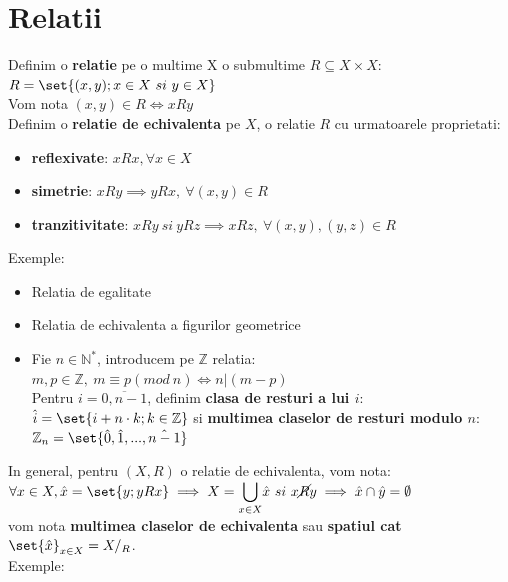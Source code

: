 \documentclass{article}
\begin{document}
    \section{Relatii}
        Definim o \textbf{relatie} pe o multime X o submultime $R \subseteq X \times X$:\\
        $R = \set{(x,y); x\in X\ si\ y \in X}$\\
        Vom nota $(x,y) \in R \iff xRy$\\
        Definim o \textbf{relatie de echivalenta} pe $X$, o relatie $R$ cu urmatoarele proprietati:
        \begin{itemize}
            \item \textbf{reflexivate}: $xRx, \forall x \in X$
            \item \textbf{simetrie}: $xRy \implies yRx,\ \forall (x,y) \in R$
            \item \textbf{tranzitivitate}: $xRy\ si\ yRz \implies xRz,\ \forall (x,y),(y,z) \in R$
        \end{itemize}
        Exemple:
        \begin{itemize}
            \item Relatia de egalitate
            \item Relatia de echivalenta a figurilor geometrice
            \item Fie $n \in \mathbb{N}^*$, introducem pe $\mathbb{Z}$ relatia:\\ $m,p \in \mathbb{Z},\ m\equiv p (mod\ n) \iff n | (m-p)$\\
            Pentru $i = \overline{0,n-1}$, definim \textbf{clasa de resturi a lui $i$}: $\hat{i} = \set{i+n\cdot k; k \in \mathbb{Z}}$ si \textbf{multimea claselor de resturi modulo $n$}: $\mathbb{Z}_n = \set{\hat{0},\hat{1},...,\hat{n-1}}$
        \end{itemize}
        In general, pentru $(X,R)$ o relatie de echivalenta, vom nota:\\ $\forall x \in X, \hat{x} = \set{y;yRx}\implies X = \displaystyle{\bigcup_{x\in X}}\hat{x}\ si\ x \cancel{R}y \implies \hat{x} \cap \hat{y} = \emptyset$\\
        vom nota \textbf{multimea claselor de echivalenta} sau \textbf{spatiul cat} $\set{\hat{x}}_{x\in X} = X/_R$.\\ 
        Exemple:
\end{document}

